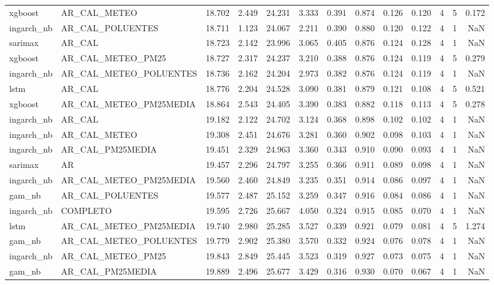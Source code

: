 \begin{tabular}{llrrrrrrrrrrr}
xgboost & AR_CAL_METEO & 18.702 & 2.449 & 24.231 & 3.333 & 0.391 & 0.874 & 0.126 & 0.120 & 4 & 5 & 0.172 \\
ingarch_nb & AR_CAL_POLUENTES & 18.711 & 1.123 & 24.067 & 2.211 & 0.390 & 0.880 & 0.120 & 0.122 & 4 & 1 & NaN \\
sarimax & AR_CAL & 18.723 & 2.142 & 23.996 & 3.065 & 0.405 & 0.876 & 0.124 & 0.128 & 4 & 1 & NaN \\
xgboost & AR_CAL_METEO_PM25 & 18.727 & 2.317 & 24.237 & 3.210 & 0.388 & 0.876 & 0.124 & 0.119 & 4 & 5 & 0.279 \\
ingarch_nb & AR_CAL_METEO_POLUENTES & 18.736 & 2.162 & 24.204 & 2.973 & 0.382 & 0.876 & 0.124 & 0.119 & 4 & 1 & NaN \\
lstm & AR_CAL & 18.776 & 2.204 & 24.528 & 3.090 & 0.381 & 0.879 & 0.121 & 0.108 & 4 & 5 & 0.521 \\
xgboost & AR_CAL_METEO_PM25MEDIA & 18.864 & 2.543 & 24.405 & 3.390 & 0.383 & 0.882 & 0.118 & 0.113 & 4 & 5 & 0.278 \\
ingarch_nb & AR_CAL & 19.182 & 2.122 & 24.702 & 3.124 & 0.368 & 0.898 & 0.102 & 0.102 & 4 & 1 & NaN \\
ingarch_nb & AR_CAL_METEO & 19.308 & 2.451 & 24.676 & 3.281 & 0.360 & 0.902 & 0.098 & 0.103 & 4 & 1 & NaN \\
ingarch_nb & AR_CAL_PM25MEDIA & 19.451 & 2.329 & 24.963 & 3.360 & 0.343 & 0.910 & 0.090 & 0.093 & 4 & 1 & NaN \\
sarimax & AR & 19.457 & 2.296 & 24.797 & 3.255 & 0.366 & 0.911 & 0.089 & 0.098 & 4 & 1 & NaN \\
ingarch_nb & AR_CAL_METEO_PM25MEDIA & 19.560 & 2.460 & 24.849 & 3.235 & 0.351 & 0.914 & 0.086 & 0.097 & 4 & 1 & NaN \\
gam_nb & AR_CAL_POLUENTES & 19.577 & 2.487 & 25.152 & 3.259 & 0.347 & 0.916 & 0.084 & 0.086 & 4 & 1 & NaN \\
ingarch_nb & COMPLETO & 19.595 & 2.726 & 25.667 & 4.050 & 0.324 & 0.915 & 0.085 & 0.070 & 4 & 1 & NaN \\
lstm & AR_CAL_METEO_PM25MEDIA & 19.740 & 2.980 & 25.285 & 3.527 & 0.339 & 0.921 & 0.079 & 0.081 & 4 & 5 & 1.274 \\
gam_nb & AR_CAL_METEO_POLUENTES & 19.779 & 2.902 & 25.380 & 3.570 & 0.332 & 0.924 & 0.076 & 0.078 & 4 & 1 & NaN \\
ingarch_nb & AR_CAL_METEO_PM25 & 19.843 & 2.849 & 25.445 & 3.523 & 0.319 & 0.927 & 0.073 & 0.075 & 4 & 1 & NaN \\
gam_nb & AR_CAL_PM25MEDIA & 19.889 & 2.496 & 25.677 & 3.429 & 0.316 & 0.930 & 0.070 & 0.067 & 4 & 1 & NaN \\

\end{tabular}

